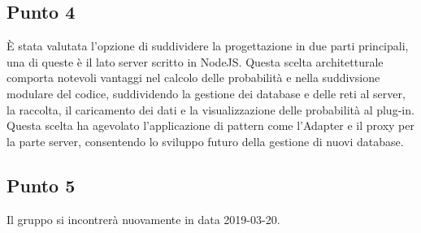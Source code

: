 \subsection{Punto 4}
È stata valutata l'opzione di suddividere la progettazione in due parti principali, una di queste è il lato server scritto in NodeJS. Questa scelta architetturale comporta notevoli vantaggi nel calcolo delle probabilità e nella suddivsione modulare del codice, suddividendo la gestione dei database e delle reti al server, la raccolta, il caricamento dei dati e la visualizzazione delle probabilità al plug-in. Questa scelta ha agevolato l'applicazione di pattern come l'Adapter e il proxy per la parte server, consentendo lo sviluppo futuro della gestione di nuovi database.

\subsection{Punto 5}
Il gruppo si incontrerà nuovamente in data 2019-03-20.